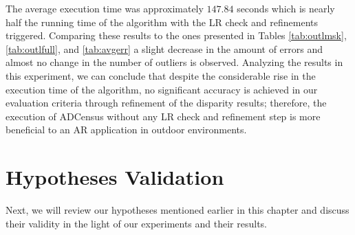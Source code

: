 The average execution time was approximately $147.84$ seconds which is nearly half the running time of the algorithm with the LR check and refinements triggered. 
Comparing these results to the ones presented in Tables \ref{tab:outlmsk}, \ref{tab:outlfull}, and \ref{tab:avgerr} a slight decrease in the amount of errors and 
almost no change in the number of outliers is observed.
Analyzing the results in this experiment, we can conclude that despite the considerable rise in the execution time of the algorithm, no significant
accuracy is achieved in our evaluation criteria through refinement of the disparity results; therefore, the execution of ADCensus without any LR check and
refinement step is more beneficial to an AR application in outdoor environments.

\section{Hypotheses Validation}
Next, we will review our hypotheses mentioned earlier in this chapter and discuss their validity in the light of our experiments and their results.

